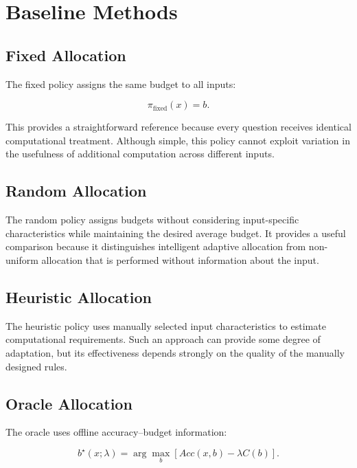 \documentclass[12pt,a4paper,titlepage]{report}
\begin{document}
\section{Baseline Methods}

\subsection{Fixed Allocation}

The fixed policy assigns the same budget to all inputs:

\begin{equation}
\pi_{\mathrm{fixed}}(x)=b.
\end{equation}

This provides a straightforward reference because every question receives identical computational treatment. Although simple, this policy cannot exploit variation in the usefulness of additional computation across different inputs.

\subsection{Random Allocation}

The random policy assigns budgets without considering input-specific characteristics while maintaining the desired average budget. It provides a useful comparison because it distinguishes intelligent adaptive allocation from non-uniform allocation that is performed without information about the input.

\subsection{Heuristic Allocation}

The heuristic policy uses manually selected input characteristics to estimate computational requirements. Such an approach can provide some degree of adaptation, but its effectiveness depends strongly on the quality of the manually designed rules.

\subsection{Oracle Allocation}

The oracle uses offline accuracy--budget information:

\begin{equation}
b^\star(x;\lambda)
=
\arg\max_b
[
Acc(x,b)-\lambda C(b)
].
\end{equation}
\end{document}

